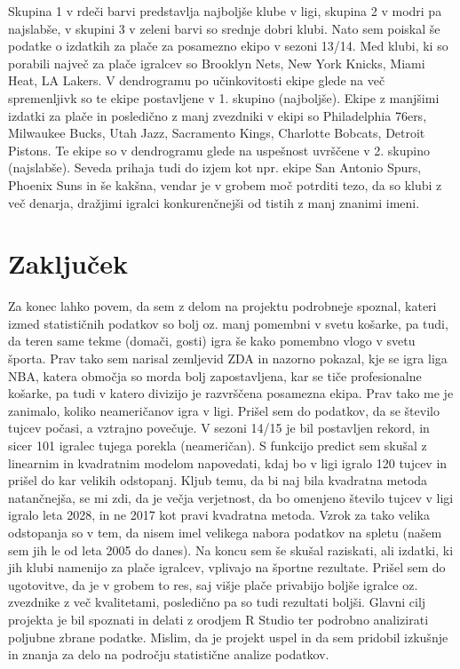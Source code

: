 \documentclass[11pt,a4paper]{article}
\begin{document}

\newpage
Skupina 1 v rdeči barvi predstavlja najboljše klube v ligi, skupina 2 v modri pa najslabše, v skupini 3 v zeleni barvi so srednje dobri klubi.
Nato sem poiskal še podatke o izdatkih za plače za posamezno ekipo v sezoni 13/14. Med klubi, ki so porabili največ za plače igralcev so Brooklyn Nets, New York Knicks, Miami Heat, LA Lakers. V dendrogramu po učinkovitosti ekipe glede na več spremenljivk so te ekipe postavljene v 1. skupino (najboljše). Ekipe z manjšimi izdatki za plače in posledično z manj zvezdniki v ekipi so Philadelphia 76ers, Milwaukee Bucks, Utah Jazz, Sacramento Kings, Charlotte Bobcats, Detroit Pistons. Te ekipe so v dendrogramu glede na uspešnost uvrščene v 2. skupino (najslabše). Seveda prihaja tudi do izjem kot npr. ekipe San Antonio Spurs, Phoenix Suns in še kakšna, vendar je v grobem moč potrditi tezo, da so klubi z več denarja, dražjimi igralci konkurenčnejši od tistih z manj znanimi imeni.

\medskip

\section{Zaključek}
Za konec lahko povem, da sem z delom na projektu podrobneje spoznal, kateri izmed statističnih podatkov so bolj oz. manj pomembni v svetu košarke, pa tudi, da teren same tekme (domači, gosti) igra še kako pomembno vlogo v svetu športa. Prav tako sem narisal zemljevid ZDA in nazorno pokazal, kje se igra liga NBA, katera območja so morda bolj zapostavljena, kar se tiče profesionalne košarke, pa tudi v katero divizijo je razvrščena posamezna ekipa. Prav tako me je zanimalo, koliko neameričanov igra v ligi. Prišel sem do podatkov, da se število tujcev počasi, a vztrajno povečuje. V sezoni 14/15 je bil postavljen rekord, in sicer 101 igralec tujega porekla (neameričan). S funkcijo predict sem skušal z linearnim in kvadratnim modelom napovedati, kdaj bo v ligi igralo 120 tujcev in prišel do kar velikih odstopanj. Kljub temu, da bi naj bila kvadratna metoda natančnejša, se mi zdi, da je večja verjetnost, da bo omenjeno število tujcev v ligi igralo leta 2028, in ne 2017 kot pravi kvadratna metoda. Vzrok za tako velika odstopanja so v tem, da nisem imel velikega nabora podatkov na spletu (našem sem jih le od leta 2005 do danes). Na koncu sem še skušal raziskati, ali izdatki, ki jih klubi namenijo za plače igralcev, vplivajo na športne rezultate. Prišel sem do ugotovitve, da je v grobem to res, saj višje plače privabijo boljše igralce oz. zvezdnike z več kvalitetami, posledično pa so tudi rezultati boljši. Glavni cilj projekta je bil spoznati in delati z orodjem R Studio ter podrobno analizirati poljubne zbrane podatke. Mislim, da je projekt uspel in da sem pridobil izkušnje in znanja za delo na področju statistične analize podatkov.
\end{document}
